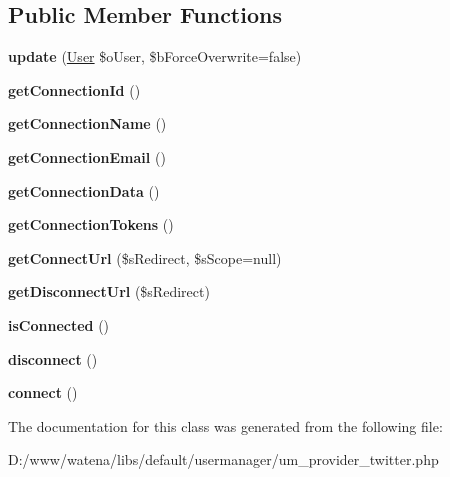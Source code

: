 \subsection*{Public Member Functions}
\begin{DoxyCompactItemize}
\item 
\hypertarget{class_provider_twitter_a1d0e1885dd373e5786b62cc6616d461a}{{\bfseries update} (\hyperlink{class_user}{User} \$o\-User, \$b\-Force\-Overwrite=false)}\label{class_provider_twitter_a1d0e1885dd373e5786b62cc6616d461a}

\item 
\hypertarget{class_provider_twitter_a95201d642501f166391023d53cbbcf0b}{{\bfseries get\-Connection\-Id} ()}\label{class_provider_twitter_a95201d642501f166391023d53cbbcf0b}

\item 
\hypertarget{class_provider_twitter_a923c8368d828950a46e59b04ba9ab426}{{\bfseries get\-Connection\-Name} ()}\label{class_provider_twitter_a923c8368d828950a46e59b04ba9ab426}

\item 
\hypertarget{class_provider_twitter_ac9e4f410cd1c5ba63e140bfc1c164f45}{{\bfseries get\-Connection\-Email} ()}\label{class_provider_twitter_ac9e4f410cd1c5ba63e140bfc1c164f45}

\item 
\hypertarget{class_provider_twitter_af3209015dcb6f4957ffeb3a90350f06b}{{\bfseries get\-Connection\-Data} ()}\label{class_provider_twitter_af3209015dcb6f4957ffeb3a90350f06b}

\item 
\hypertarget{class_provider_twitter_a9da825cb6ad1349974017fcab80bf2ee}{{\bfseries get\-Connection\-Tokens} ()}\label{class_provider_twitter_a9da825cb6ad1349974017fcab80bf2ee}

\item 
\hypertarget{class_provider_twitter_a7469007636f1d20f4a6851d8efa98829}{{\bfseries get\-Connect\-Url} (\$s\-Redirect, \$s\-Scope=null)}\label{class_provider_twitter_a7469007636f1d20f4a6851d8efa98829}

\item 
\hypertarget{class_provider_twitter_ac64cf080214a1e705ce1eaea43a7df0c}{{\bfseries get\-Disconnect\-Url} (\$s\-Redirect)}\label{class_provider_twitter_ac64cf080214a1e705ce1eaea43a7df0c}

\item 
\hypertarget{class_provider_twitter_a1a44db4c37f8a8ed1a2e59f89eca3f05}{{\bfseries is\-Connected} ()}\label{class_provider_twitter_a1a44db4c37f8a8ed1a2e59f89eca3f05}

\item 
\hypertarget{class_provider_twitter_aaa44c05ef1e9d2d5bd07bb8861edd2f3}{{\bfseries disconnect} ()}\label{class_provider_twitter_aaa44c05ef1e9d2d5bd07bb8861edd2f3}

\item 
\hypertarget{class_provider_twitter_a1bd26fba01fc40045f62b32ed73e722d}{{\bfseries connect} ()}\label{class_provider_twitter_a1bd26fba01fc40045f62b32ed73e722d}

\end{DoxyCompactItemize}


The documentation for this class was generated from the following file\-:\begin{DoxyCompactItemize}
\item 
D\-:/www/watena/libs/default/usermanager/um\-\_\-provider\-\_\-twitter.\-php\end{DoxyCompactItemize}
